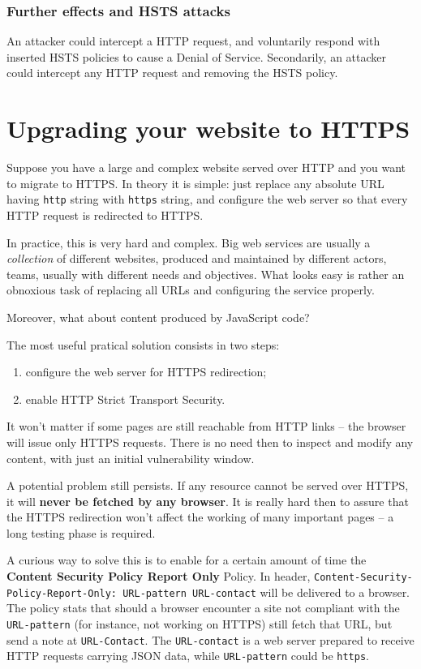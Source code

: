 \documentclass[10pt]{extbook}
\begin{document}
\subsubsection{Further effects and HSTS attacks}

An attacker could intercept a HTTP request, and voluntarily respond with
inserted HSTS policies to cause a Denial of Service. Secondarily, an attacker
could intercept any HTTP request and removing the HSTS policy.

\section{Upgrading your website to HTTPS}

Suppose you have a large and complex website served over HTTP and you want to
migrate to HTTPS. In theory it is simple: just replace any absolute URL having
\texttt{http} string with \texttt{https} string, and configure the web server
so that every HTTP request is redirected to HTTPS.

In practice, this is very hard and complex. Big web services are usually a
\emph{collection} of different websites, produced and maintained by different
actors, teams, usually with different needs and objectives. What looks easy is
rather an obnoxious task of replacing all URLs and configuring the service
properly.

Moreover, what about content produced by JavaScript code?

The most useful pratical solution consists in two steps:
\begin{enumerate}
    \item configure the web server for HTTPS redirection;
    \item enable HTTP Strict Transport Security.
\end{enumerate}

It won't matter if some pages are still reachable from HTTP links -- the
browser will issue only HTTPS requests. There is no need then to inspect and
modify any content, with just an initial vulnerability window.

A potential problem still persists. If any resource cannot be served over
HTTPS, it will \textbf{never be fetched by any browser}. It is really hard then
to assure that the HTTPS redirection won't affect the working of many important
pages -- a long testing phase is required.

A curious way to solve this is to enable for a certain amount of time the
\textbf{Content Security Policy Report Only} Policy. In header,
\texttt{Content\--Security\--Policy\--Report\--Only: URL\--pattern
URL\--contact} will be delivered to a browser. The policy stats that should a
browser encounter a site not compliant with the \texttt{URL-pattern} (for
instance, not working on HTTPS) still fetch that URL, but send a note at
\texttt{URL-Contact}. The \texttt{URL-contact} is a web server prepared to
receive HTTP requests carrying JSON data, while \texttt{URL-pattern} could be
\texttt{https}.
\end{document}
